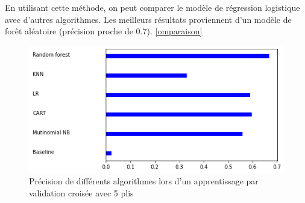 En utilisant cette méthode, on peut comparer le modèle de régression logistique avec d'autres algorithmes. Les meilleurs résultats proviennent d'un modèle de forêt aléatoire (précision proche de 0.7). \ref{omparaison}

\begin{figure}
    \center
    \includegraphics[scale=.5]{img/comparaison.png}
    \caption{Précision de différents algorithmes lors d'un apprentissage par validation croisée avec 5 plis}
    \label{comparaison}
\end{figure}